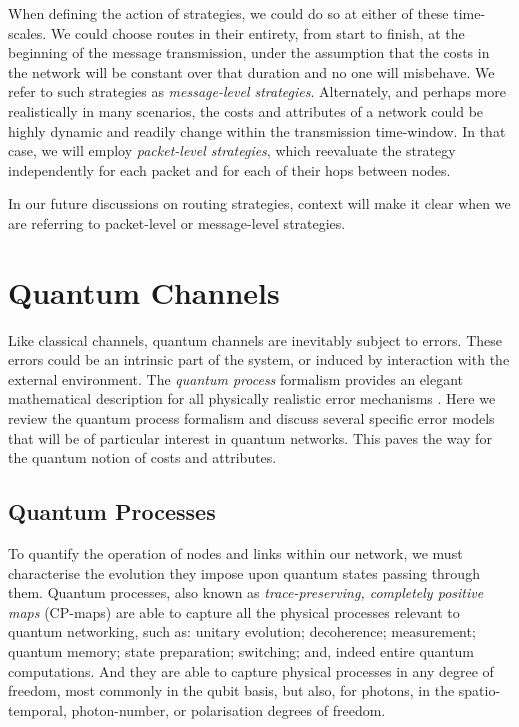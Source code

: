 \documentclass[aps,rmp,twocolumn,amsmath,amssymb,nofootinbib,superscriptaddress]{revtex4}
\begin{document}
When defining the action of strategies, we could do so at either of these time-scales. We could choose routes in their entirety, from start to finish, at the beginning of the message transmission, under the assumption that the costs in the network will be constant over that duration and no one will misbehave. We refer to such strategies as \emph{message-level strategies}. Alternately, and perhaps more realistically in many scenarios, the costs and attributes of a network could be highly dynamic and readily change within the transmission time-window. In that case, we will employ \emph{packet-level strategies}, which reevaluate the strategy independently for each packet and for each of their hops between nodes.

In our future discussions on routing strategies, context will make it clear when we are referring to packet-level or message-level strategies.

%
%

\section{Quantum Channels} \label{sec:quant_chan}

Like classical channels, quantum channels are inevitably subject to errors. These errors could be an intrinsic part of the system, or induced by interaction with the external environment. The \emph{quantum process} formalism provides an elegant mathematical description for all physically realistic error mechanisms \cite{bib:NielsenChuang00, bib:Gilchrist05}. Here we review the quantum process formalism and discuss several specific error models that will be of particular interest in quantum networks. This paves the way for the quantum notion of costs and attributes.

%
%

\subsection{Quantum Processes}

To quantify the operation of nodes and links within our network, we must characterise the evolution they impose upon quantum states passing through them. Quantum processes, also known as \emph{trace-preserving, completely positive maps} (CP-maps) are able to capture all the physical processes relevant to quantum networking, such as: unitary evolution; decoherence; measurement; quantum memory; state preparation; switching; and, indeed entire quantum computations. And they are able to capture physical processes in any degree of freedom, most commonly in the qubit basis, but also, for photons, in the spatio-temporal, photon-number, or polarisation degrees of freedom.
\end{document}

